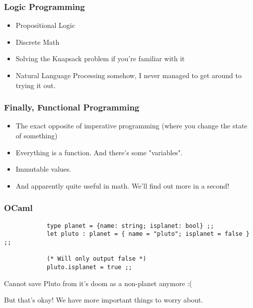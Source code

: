 \documentclass[handout]{beamer}
\begin{document}
    \begin{frame}
        \frametitle{Logic Programming}

        \begin{itemize}
            \item<1-> Propositional Logic
            \item<2-> Discrete Math
            \item<3-> Solving the Knapsack problem if you're familiar with it
            \item<4-> Natural Language Processing somehow, I never managed to get around to trying it out.
        \end{itemize}
    \end{frame}

    \begin{frame}
        \frametitle{Finally, Functional Programming}

        \begin{itemize}
            \item<1-> The exact opposite of imperative programming (where you change the state of something)
            \item<2-> Everything is a function. And there's some "variables".
            \item<3-> Immutable values.
            \item<4-> And apparently quite useful in math. We'll find out more in a second!
        \end{itemize}

    \end{frame}

    \begin{frame}[fragile]
        \frametitle{OCaml}
        \scriptsize
        \begin{verbatim}
            type planet = {name: string; isplanet: bool} ;;
            let pluto : planet = { name = "pluto"; isplanet = false } ;;

            (* Will only output false *)
            pluto.isplanet = true ;;
        \end{verbatim} \pause
        Cannot save Pluto from it's doom as a non-planet anymore :( \pause

        But that's okay! We have more important things to worry about.
    \end{frame}
\end{document}
